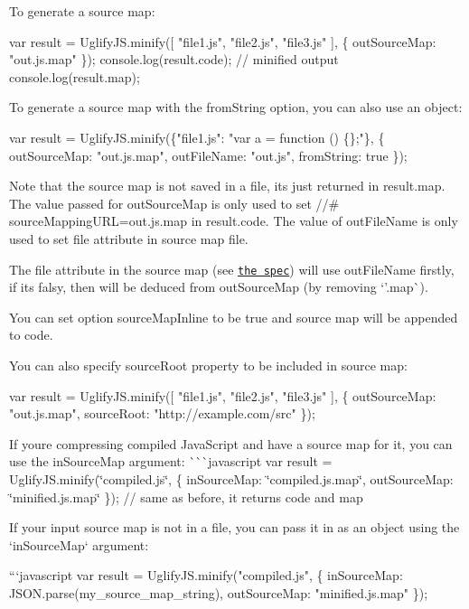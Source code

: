 To generate a source map\+: 
\begin{DoxyCode}
var result = UglifyJS.minify([ "file1.js", "file2.js", "file3.js" ], \{
    outSourceMap: "out.js.map"
\});
console.log(result.code); // minified output
console.log(result.map);
\end{DoxyCode}


To generate a source map with the from\+String option, you can also use an object\+: 
\begin{DoxyCode}
var result = UglifyJS.minify(\{"file1.js": "var a = function () \{\};"\}, \{
  outSourceMap: "out.js.map",
  outFileName: "out.js",
  fromString: true
\});
\end{DoxyCode}


Note that the source map is not saved in a file, it\textquotesingle{}s just returned in {\ttfamily result.\+map}. The value passed for {\ttfamily out\+Source\+Map} is only used to set {\ttfamily //\# source\+Mapping\+U\+RL=out.\+js.\+map} in {\ttfamily result.\+code}. The value of {\ttfamily out\+File\+Name} is only used to set {\ttfamily file} attribute in source map file.

The {\ttfamily file} attribute in the source map (see \href{https://docs.google.com/document/d/1U1RGAehQwRypUTovF1KRlpiOFze0b-_2gc6fAH0KY0k/edit}{\tt the spec}) will use {\ttfamily out\+File\+Name} firstly, if it\textquotesingle{}s falsy, then will be deduced from {\ttfamily out\+Source\+Map} (by removing `'.map\textquotesingle{}\`{}).

You can set option {\ttfamily source\+Map\+Inline} to be {\ttfamily true} and source map will be appended to code.

You can also specify source\+Root property to be included in source map\+: 
\begin{DoxyCode}
var result = UglifyJS.minify([ "file1.js", "file2.js", "file3.js" ], \{
    outSourceMap: "out.js.map",
    sourceRoot: "http://example.com/src"
\});
\end{DoxyCode}


If you\textquotesingle{}re compressing compiled Java\+Script and have a source map for it, you can use the {\ttfamily in\+Source\+Map} argument\+: \`{}\`{}\`{}javascript var result = Uglify\+J\+S.\+minify(\char`\"{}compiled.\+js\char`\"{}, \{ in\+Source\+Map\+: \char`\"{}compiled.\+js.\+map\char`\"{}, out\+Source\+Map\+: \char`\"{}minified.\+js.\+map\char`\"{} \}); // same as before, it returns {\ttfamily code} and {\ttfamily map} 
\begin{DoxyCode}
If your input source map is not in a file, you can pass it in as an object
using the `inSourceMap` argument:

```javascript
var result = UglifyJS.minify("compiled.js", \{
    inSourceMap: JSON.parse(my\_source\_map\_string),
    outSourceMap: "minified.js.map"
\});
\end{DoxyCode}


